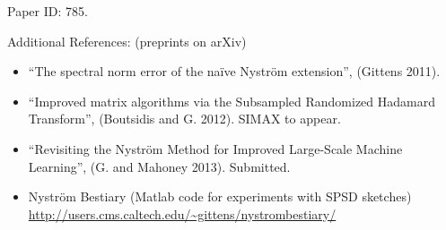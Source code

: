 \documentclass[xcolor=x11names,compress,ignorenonframetext,10pt]{beamer}
\renewcommand{\(}{\begin{columns}}
\renewcommand{\)}{\end{columns}}
\newcommand{\<}[1]{\begin{column}{#1}}
\renewcommand{\>}{\end{column}}
\def\refcolor{DodgerBlue4}
\newcommand{\refer}[1]{({\color{\refcolor}#1})}
\begin{document}
 \begin{frame}
   Paper ID: 785.
   \vspace{0.7em}
   
   Additional References: (preprints on arXiv)
  \begin{itemize}
   \item ``The spectral norm error of the na\"ive Nystr\"om extension'', \refer{Gittens 2011}.
   \item ``Improved matrix algorithms via the Subsampled Randomized Hadamard Transform'', \refer{Boutsidis and G. 2012}. SIMAX to appear.
   \item ``Revisiting the Nystr\"om Method for Improved Large-Scale Machine Learning'', \refer{G. and Mahoney 2013}. Submitted.
   \item Nystr\"om Bestiary (Matlab code for experiments with SPSD sketches)
          \url{http://users.cms.caltech.edu/~gittens/nystrombestiary/}
  \end{itemize}

 \end{frame}

%  
% 

% 
% 
% 
% 
\end{document}
